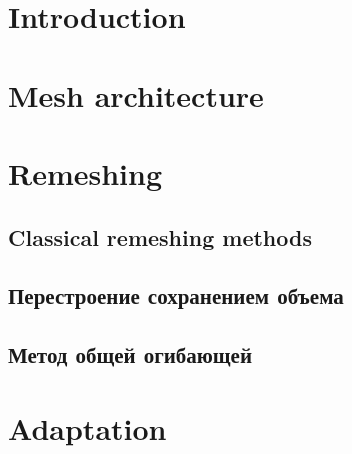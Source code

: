 \documentclass[
11pt,%
tightenlines,%
twoside,%
onecolumn,%
nofloats,%
nobibnotes,%
nofootinbib,%
superscriptaddress,%
noshowpacs,%
centertags]%
{revtex4}
\begin{document}


\maketitle


\section{Introduction}



\section{Mesh architecture}



\section{Remeshing}

\subsection{Classical remeshing methods}

\subsection{Перестроение сохранением объема}

\subsection{Метод общей огибающей}



\section{Adaptation}

\end{document}
